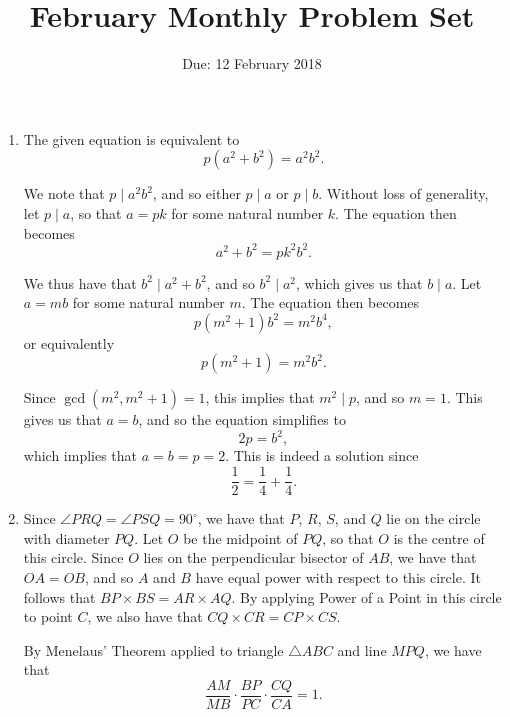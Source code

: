 \documentclass[12pt]{article}
\title{\vspace{-24pt}February Monthly Problem Set}
\author{Due: 12 February 2018}
\date{}
\begin{document}
 \maketitle \pagestyle{empty}

\begin{enumerate}

\item %
The given equation is equivalent to
\[
    p(a^2 + b^2) = a^2 b^2.
\]

We note that $p \mid a^2 b^2$, and so either $p \mid a$ or $p \mid
b$. Without loss of generality, let $p \mid a$, so that $a = pk$ for some
natural number $k$. The equation then becomes
\[
    a^2 + b^2 = pk^2 b^2.
\]

We thus have that $b^2 \mid a^2 + b^2$, and so $b^2 \mid a^2$, which
gives us that $b \mid a$. Let $a = mb$ for some natural number $m$. The
equation then becomes
\[
    p(m^2 + 1) b^2 = m^2 b^4,
\]
or equivalently
\[
    p(m^2 + 1) = m^2 b^2.
\]

Since $\gcd(m^2, m^2 + 1) = 1$, this implies that $m^2 \mid p$, and so $m =
1$. This gives us that $a = b$, and so the equation simplifies to
\[
    2p = b^2,
\]
which implies that $a = b = p = 2$. This is indeed a solution since
\[
    \frac{1}{2} = \frac{1}{4} + \frac{1}{4}.
\]

\item %
Since $\angle PRQ = \angle PSQ = 90^\circ$, we have that $P$, $R$, $S$, and $Q$
lie on the circle with diameter $PQ$. Let $O$ be the midpoint of $PQ$, so that
$O$ is the centre of this circle. Since $O$ lies on the perpendicular bisector
of $AB$, we have that $OA = OB$, and so $A$ and $B$ have equal power with
respect to this circle. It follows that $BP \times BS = AR \times AQ$. By
applying Power of a Point in this circle to point $C$, we also have that $CQ
\times CR = CP \times CS$.

By Menelaus' Theorem applied to triangle $\triangle ABC$ and line $MPQ$, we have that
\[
    \frac{AM}{MB} \cdot \frac{BP}{PC} \cdot \frac{CQ}{CA} = 1.
\]


\end{enumerate}
\end{document}
